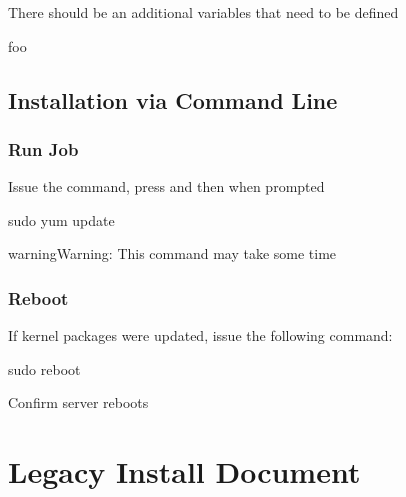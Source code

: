 \documentclass[letterpaper,10pt,english]{sphinxmanual}
\begin{document}
\sphinxAtStartPar
There should be an additional variables that need to be defined

\begin{sphinxVerbatim}[commandchars=\\\{\}]
 foo
\end{sphinxVerbatim}


\section{Installation via Command Line}
\label{\detokenize{install:installation-via-command-line}}

\subsection{Run Job}
\label{\detokenize{install:run-job}}
\sphinxAtStartPar
Issue the command, press  and then \sphinxcode{\sphinxupquote{{[}ENTER{]}}} when prompted

\begin{sphinxVerbatim}[commandchars=\\\{\}]
sudo yum update
\end{sphinxVerbatim}

\begin{sphinxadmonition}{warning}{Warning:}
\sphinxAtStartPar
This command may take some time
\end{sphinxadmonition}


\subsection{Reboot}
\label{\detokenize{install:reboot}}
\sphinxAtStartPar
If kernel packages were updated, issue the following command:

\begin{sphinxVerbatim}[commandchars=\\\{\}]
sudo reboot
\end{sphinxVerbatim}

\sphinxAtStartPar
{} Confirm server reboots


\chapter{Legacy Install Document}
\label{\detokenize{legacy/legacy-install:legacy-install-document}}\label{\detokenize{legacy/legacy-install::doc}}
\end{document}
